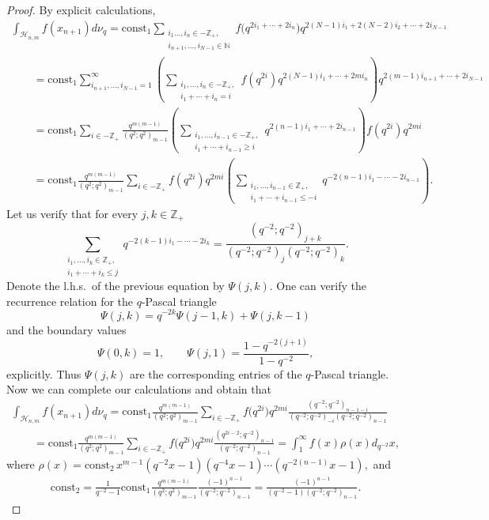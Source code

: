 \begin{proof} By explicit calculations,
\begin{gather*}
\int_{\mathscr{H}_{n,m}} f(x_{n+1}) d\nu_q= \mathrm{const_1}
\sum_{\substack{i_1\ldots,i_n \in -\mathbb{Z}_+,\\
i_{n+1},\ldots,i_{N-1} \in \mathbb{N}}} f\big(q^{2i_1+\cdots+2i_n}\big)
q^{2(N-1)i_1+2(N-2)i_2+\cdots+2i_{N-1}}
\\
\qquad{} = \mathrm{const_1}    \sum \limits_{i_{n+1},\ldots,i_{N-1}=1}^\infty \left(\sum_{\substack{i_1, \ldots, i_n
\in -\mathbb Z_+, \\ i_1+\cdots+i_n=i}} f(q^{2i})
q^{2(N-1)i_1+\cdots+2mi_n}\right) q^{2(m-1)i_{n+1}+\cdots+2i_{N-1}}
\\
\qquad{}= \mathrm{const_1} \sum_{i \in -\mathbb Z_+} \frac{q^{m(m-1)}}{(q^2;q^2)_{m-1}} \left(\sum_{\substack{i_1, \ldots, i_{n-1}
\in -\mathbb Z_+, \\ i_1+\cdots+i_{n-1} \geq i}}
q^{2(n-1)i_1+\cdots+2i_{n-1}}\right)f(q^{2i})q^{2mi}
\\
\qquad{}= \mathrm{const_1} \frac{q^{m(m-1)}}{(q^2;q^2)_{m-1}} \sum_{i \in -\mathbb Z_+} f(q^{2i})q^{2mi}  \left(
\sum_{\substack{i_1, \ldots, i_{n-1} \in \mathbb Z_+, \\ i_1+\cdots+i_{n-1} \leq -i}}
q^{-2(n-1)i_1-\cdots-2i_{n-1}}\right).
\end{gather*}
Let us verify that for every $j,k \in \mathbb Z_+$
\[
\sum_{\substack{i_1, \ldots, i_k \in \mathbb Z_+, \\ i_1+\cdots+i_k
\leq j}}
q^{-2(k-1)i_1-\cdots-2i_k}=\frac{(q^{-2};q^{-2})_{j+k}}{(q^{-2};q^{-2})_j(q^{-2};q^{-2})_k}.
\]
Denote the l.h.s.\ of the previous equation by $\Psi(j,k)$. One can verify the recurrence relation for the
$q$-Pascal triangle
\[
\Psi(j,k)=q^{-2k}\Psi(j-1,k)+\Psi(j,k-1)
\]
and the boundary values
\[
\Psi(0,k)=1, \qquad \Psi(j,1)=\frac{1-q^{-2(j+1)}}{1-q^{-2}},
\]
explicitly. Thus $\Psi(j,k)$ are the corresponding entries of the $q$-Pascal triangle. Now we can complete our
calculations and obtain that
\begin{gather*}
\int_{\mathscr{H}_{n,m}} f(x_{n+1}) d\nu_q= \mathrm{const_1}
\frac{q^{m(m-1)}}{(q^2;q^2)_{m-1}} \sum_{i \in -\mathbb Z_+} f\big(q^{2i}\big)
q^{2mi}
\frac{(q^{-2};q^{-2})_{n-1-i}}{(q^{-2};q^{-2})_{-i}(q^{-2};q^{-2})_{n-1}}
\\
\qquad {} = \mathrm{const_1}   \frac{q^{m(m-1)}}{(q^2;q^2)_{m-1}} \sum_{i
\in -\mathbb Z_+} f\big(q^{2i}\big) q^{2mi}
\frac{(q^{2i-2};q^{-2})_{n-1}}{(q^{-2};q^{-2})_{n-1}}=\int_1^\infty
f(x)\rho(x) d_{q^{-2}}x,
\end{gather*}
where $\rho(x)=\mathrm{const_2} \,  x^{m-1}(q^{-2}x-1)(q^{-4}x-1)\cdots (q^{-2(n-1)}x-1),$ and
\begin{gather*}
\mathrm{const_2}=\frac{1}{q^{-2}-1} \mathrm{const_1}   \frac{q^{m(m-1)}}{(q^2;q^2)_{m-1}}
\frac{(-1)^{n-1}}{(q^{-2};q^{-2})_{n-1}} =
\frac{(-1)^{n-1}}{(q^{-2}-1)(q^{-2};q^{-2})_{n-1}}.  \tag*{\qed}
\end{gather*}
\renewcommand{\qed}{}
\end{proof}

